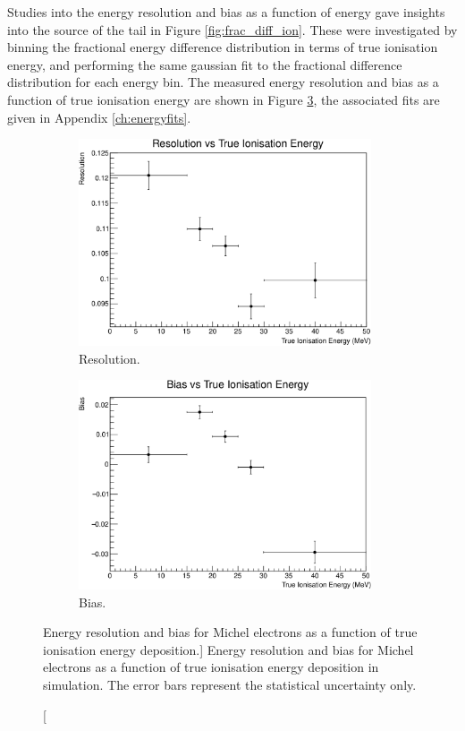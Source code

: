 Studies into the energy resolution and bias as a function of energy gave
insights into the source of the tail in Figure \ref{fig:frac_diff_ion}. These
were investigated by binning the fractional energy difference distribution in
terms of true ionisation energy, and performing the same gaussian fit to the
fractional difference distribution for each energy bin. The measured energy 
resolution and bias as a function of true ionisation energy are shown in 
Figure \ref{fig:res_and_bias_ion}, the associated fits are given in Appendix 
\ref{ch:energyfits}.
\begin{figure}
	\centering
	\begin{subfigure}[b]{\textwidth}
		\centering
		\includegraphics[width=0.95\textwidth]{figures/res_v_energy_ion.pdf}
		\caption {Resolution.}
		\label{fig:res_ion}
	\end{subfigure}
	\begin{subfigure}[b]{\textwidth}
		\centering
		\vspace{5mm}
		\includegraphics[width=0.95\textwidth]{figures/bias_v_energy_ion.pdf}
		\caption {Bias.}
		\label{fig:bias_ion}
	\end{subfigure}
	\caption
	[Energy resolution and bias for Michel electrons as a function of true 
	ionisation energy deposition.]
	{Energy resolution and bias for Michel electrons as a function of true 
	ionisation energy deposition in \protodune{} simulation. The error bars
	represent the statistical uncertainty only.}
	\label{fig:res_and_bias_ion}
\end{figure}

